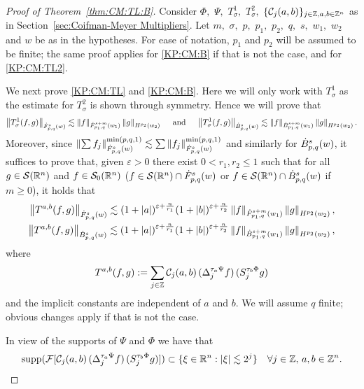  \begin{proof}[Proof of Theorem~\ref{thm:CM:TL:B}] Consider $\Phi,$ $\Psi,$ $T_\sigma^1,$ $T_\sigma^2,$ $\{\C_j(a,b)\}_{j\in\ent,a,b\in\ent^n}$ as in Section~\ref{sec:Coifman-Meyer Multipliers}. Let $m,$ $\sigma,$ $p,$ $p_1,$ $p_2,$ $q,$ $s,$ $w_1,$ $w_2$ and $w$ be as in the hypotheses.  
For ease of notation, $p_1$ and $p_2$ will be assumed to be finite; the same proof applies for \eqref{KP:CM:B} if that is not the case, and for \eqref{KP:CM:TL2}.


We next prove \eqref{KP:CM:TL} and \eqref{KP:CM:B}. Here we will only work with $T_\sigma^1$ as the estimate for $T_\sigma^2$ is shown through symmetry. Hence we will prove that 
 \begin{align*}
 \norm{T^{1}_\sigma(f,g)}{\dot{F}^s_{p,q}(w)} \lesssim  \norm{f}{\dot{F}^{s+m}_{p_1, q}(w_1)} \norm{g}{H^{p_2}(w_2)}\quad  \text{ and }\quad 
 \norm{T^1_\sigma(f,g)}{\dot{B}^s_{p,q}(w)} \lesssim  \norm{f}{\dot{B}^{s+m}_{p_1, q}(w_1)} \norm{g}{H^{p_2}(w_2)}.
\end{align*}
  Moreover, since $\norm{\sum f_j}{\tlw{p}{s}{q}{w}}^{\min(p,q,1)}\lesssim \sum\norm{f_j}{\tlw{p}{s}{q}{w}}^{\min(p,q,1)}$  and similarly for $\besw{p}{s}{q}{w}$, it suffices to prove that, given $\varepsilon>0$ there exist $0<r_1,r_2\le 1$  such that for all $g\in \sw$ and  $f\in \swz$ ($f\in \sw\cap \tlw{p}{s}{q}{w}$ or  $f\in \sw\cap \besw{p}{s}{q}{w}$ if $m\ge 0$),  it holds that
\begin{align}
 \norm{T^{a,b}(f,g)}{\dot{F}^s_{p,q}(w)} \lesssim (1+\abs{a})^{\varepsilon+\frac{n}{r_1}}  (1+\abs{b})^{\varepsilon+\frac{n}{r_2}} \norm{f}{\dot{F}^{s+m}_{p_1, q}(w_1)} \norm{g}{H^{p_2}(w_2)}\label{eq:estbbTL},\\
 \norm{T^{a,b}(f,g)}{\dot{B}^s_{p,q}(w)} \lesssim (1+\abs{a})^{\varepsilon+\frac{n}{r_1}}  (1+\abs{b})^{\varepsilon+\frac{n}{r_2}} \norm{f}{\dot{B}^{s+m}_{p_1, q}(w_1)} \norm{g}{H^{p_2}(w_2)}\label{eq:estbbB},
\end{align}
where
\[
T^{a,b}(f,g):=\sum_{j\in\ent} \C_j(a,b) \,(\Do{ \tau_a \Psi }{j} f)\, (\So{ \tau_b \Phi }{j} g )
\]
and the implicit constants are independent of $a$ and $b.$  We will assume $q$ finite; obvious changes apply if that is not the case.

In view of the supports of $\Psi$ and $\Phi$ we have that 
\begin{equation*}
\supp (\mathcal{F}[\C_j(a,b) \,(\Do{ \tau_a \Psi }{j} f ) \, ( \So{ \tau_b \Phi }{j} g )])  \subset \{\xi \in \rn: |\xi| \lesssim 2^j \} \quad \forall j \in \ent,\,a,b\in \ent^n.
\end{equation*}


\end{proof}

